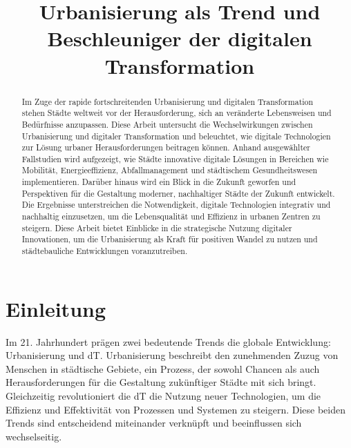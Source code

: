 \documentclass[conference,compsoc,final,a4paper, onecolumn, 11pt]{IEEEtran}
\newcommand{\dokumententitel}[0]{Urbanisierung als Trend und Beschleuniger der digitalen Transformation}
\begin{document}
\title{\dokumententitel}

\author{
  \and
  \and
}

\maketitle
\thispagestyle{plain}
\pagestyle{plain}

\begin{abstract}
Im Zuge der rapide fortschreitenden Urbanisierung und digitalen Transformation stehen Städte weltweit vor der Herausforderung, sich an veränderte Lebensweisen und Bedürfnisse anzupassen. 
Diese Arbeit untersucht die Wechselwirkungen zwischen Urbanisierung und digitaler Transformation und beleuchtet, wie digitale Technologien zur Lösung urbaner Herausforderungen beitragen können. 
Anhand ausgewählter Fallstudien wird aufgezeigt, wie Städte innovative digitale Lösungen in Bereichen wie Mobilität, Energieeffizienz, Abfallmanagement und städtischem Gesundheitswesen implementieren. 
Darüber hinaus wird ein Blick in die Zukunft geworfen und Perspektiven für die Gestaltung moderner, nachhaltiger Städte der Zukunft entwickelt. 
Die Ergebnisse unterstreichen die Notwendigkeit, digitale Technologien integrativ und nachhaltig einzusetzen, um die Lebensqualität und Effizienz in urbanen Zentren zu steigern. 
Diese Arbeit bietet Einblicke in die strategische Nutzung digitaler Innovationen, um die Urbanisierung als Kraft für positiven Wandel zu nutzen und städtebauliche Entwicklungen voranzutreiben.
\end{abstract}

{\tableofcontents}


\section{Einleitung}
Im 21. Jahrhundert prägen zwei bedeutende Trends die globale Entwicklung: Urbanisierung und \ac{dT}. 
Urbanisierung beschreibt den zunehmenden Zuzug von Menschen in städtische Gebiete, ein Prozess, der sowohl Chancen als auch Herausforderungen für die Gestaltung zukünftiger Städte mit sich bringt. 
Gleichzeitig revolutioniert die \ac{dT} die Nutzung neuer Technologien, um die Effizienz und Effektivität von Prozessen und Systemen zu steigern. 
Diese beiden Trends sind entscheidend miteinander verknüpft und beeinflussen sich wechselseitig.
\end{document}
